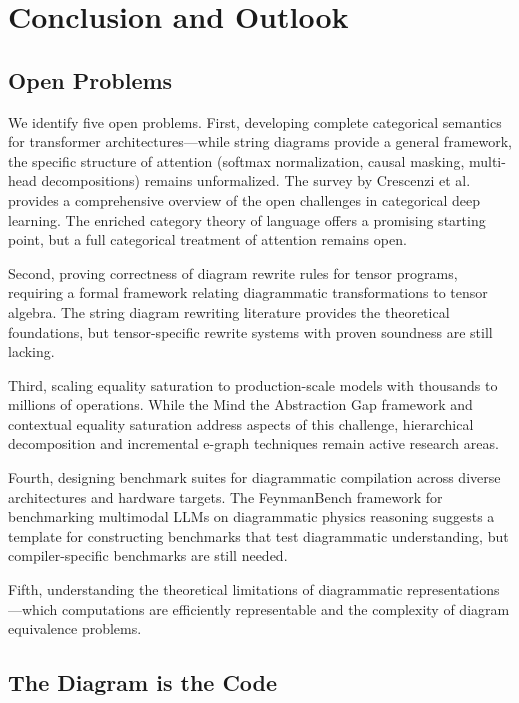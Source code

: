 \documentclass[12pt,a4paper]{article}
\begin{document}
\section{Conclusion and Outlook}
\subsection{Open Problems}

We identify five open problems. First, developing complete categorical semantics for transformer architectures---while string diagrams provide a general framework, the specific structure of attention (softmax normalization, causal masking, multi-head decompositions) remains unformalized. The survey by Crescenzi et al.~\cite{crescenzi2024towards} provides a comprehensive overview of the open challenges in categorical deep learning. The enriched category theory of language \cite{bradley2022an} offers a promising starting point, but a full categorical treatment of attention remains open.

Second, proving correctness of diagram rewrite rules for tensor programs, requiring a formal framework relating diagrammatic transformations to tensor algebra. The string diagram rewriting literature \cite{acclaviondstring, bonchi2020stringdr, bonchi2021stringdr} provides the theoretical foundations, but tensor-specific rewrite systems with proven soundness are still lacking.

Third, scaling equality saturation \cite{tate2011equality} to production-scale models with thousands to millions of operations. While the Mind the Abstraction Gap framework \cite{vohra2025mindta} and contextual equality saturation \cite{drewery2025contextuales} address aspects of this challenge, hierarchical decomposition and incremental e-graph techniques remain active research areas.

Fourth, designing benchmark suites for diagrammatic compilation across diverse architectures and hardware targets. The FeynmanBench framework \cite{feynmanbench2026feynmanbench} for benchmarking multimodal LLMs on diagrammatic physics reasoning suggests a template for constructing benchmarks that test diagrammatic understanding, but compiler-specific benchmarks are still needed.

Fifth, understanding the theoretical limitations of diagrammatic representations---which computations are efficiently representable and the complexity of diagram equivalence problems.

\subsection{The Diagram is the Code}
\end{document}
